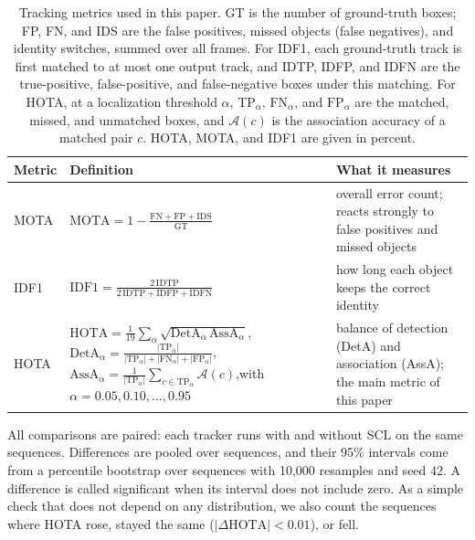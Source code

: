 \documentclass[pdflatex,sn-mathphys-num,iicol]{sn-jnl}
\newcommand{\scl}{SCL}
\begin{document}
\begin{table}[t]
\caption{Tracking metrics used in this paper. GT is the number of
ground-truth boxes; FP, FN, and IDS are the false positives, missed objects
(false negatives), and identity switches, summed over all frames. For IDF1,
each ground-truth track is first matched to at most one output track, and
IDTP, IDFP, and IDFN are the true-positive, false-positive, and
false-negative boxes under this matching. For HOTA, at a localization
threshold $\alpha$, $\mathrm{TP}_\alpha$, $\mathrm{FN}_\alpha$, and
$\mathrm{FP}_\alpha$ are the matched, missed, and unmatched boxes, and
$\mathcal{A}(c)$ is the association accuracy of a matched pair $c$. HOTA,
MOTA, and IDF1 are given in percent.}
\label{tab:metrics}
\centering\footnotesize
\setlength{\tabcolsep}{4pt}
\renewcommand{\arraystretch}{1.6}
\begin{tabular}{@{}l>{\raggedright\arraybackslash}p{78mm}>{\raggedright\arraybackslash}p{58mm}@{}}
\toprule
Metric & Definition & What it measures\\
\midrule
MOTA \cite{bernardin2008clear} & $\displaystyle \mathrm{MOTA}=1-\frac{\mathrm{FN}+\mathrm{FP}+\mathrm{IDS}}{\mathrm{GT}}$ & overall error count; reacts strongly to false positives and missed objects\\
IDF1 \cite{ristani2016idf1} & $\displaystyle \mathrm{IDF1}=\frac{2\,\mathrm{IDTP}}{2\,\mathrm{IDTP}+\mathrm{IDFP}+\mathrm{IDFN}}$ & how long each object keeps the correct identity\\
HOTA \cite{luiten2021hota} & $\displaystyle \mathrm{HOTA}=\frac{1}{19}\sum_{\alpha}\sqrt{\mathrm{DetA}_\alpha\,\mathrm{AssA}_\alpha}$,\newline $\displaystyle \mathrm{DetA}_\alpha=\frac{|\mathrm{TP}_\alpha|}{|\mathrm{TP}_\alpha|+|\mathrm{FN}_\alpha|+|\mathrm{FP}_\alpha|}$,\quad $\displaystyle \mathrm{AssA}_\alpha=\frac{1}{|\mathrm{TP}_\alpha|}\sum_{c\in\mathrm{TP}_\alpha}\mathcal{A}(c)$,\newline with $\alpha=0.05,0.10,\dots,0.95$ & balance of detection (DetA) and association (AssA); the main metric of this paper\\
\bottomrule
\end{tabular}
\end{table}

All comparisons are paired: each tracker runs with and without \scl{} on
the same sequences. Differences are pooled over sequences, and their 95\%
intervals come from a percentile bootstrap over sequences
\cite{efron1993bootstrap} with 10,000 resamples and seed 42. A difference is
called significant when its interval does not include zero. As a simple
check that does not depend on any distribution, we also count the sequences
where HOTA rose, stayed the same ($|\Delta\mathrm{HOTA}|<0.01$), or fell.
\end{document}
